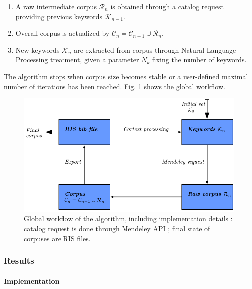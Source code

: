 \begin{enumerate}
\item A raw intermediate corpus $\mathcal{R}_n$ is obtained through a catalog request providing previous keywords $\mathcal{K}_{n-1}$.
\item Overall corpus is actualized by $\mathcal{C}_n = \mathcal{C}_{n-1} \cup \mathcal{R}_n$.
\item New keywords $\mathcal{K}_n$ are extracted from corpus through Natural Language Processing treatment, given a parameter $N_k$ fixing the number of keywords.
\end{enumerate}

The algorithm stops when corpus size becomes stable or a user-defined maximal number of iterations has been reached. Fig. 1 shows the global workflow.



\begin{figure}
\centering
\includegraphics[width=\textwidth]{Figures/PartI/QuantitativeEpistemo/schema_algo}
\caption[Systematic review algorithm workflow]{Global workflow of the algorithm, including implementation details : catalog request is done through Mendeley API ; final state of corpuses are RIS files.}
\label{fig:quantepistemo:algo}
\end{figure}



\subsubsection{Results}

\paragraph{Implementation}

